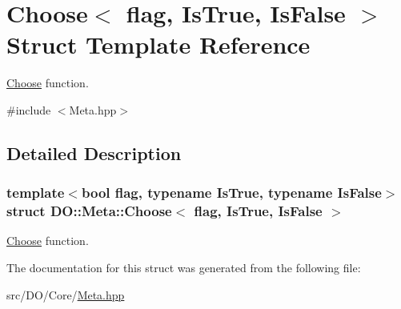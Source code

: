 \hypertarget{struct_d_o_1_1_meta_1_1_choose}{\section{Choose$<$ flag, Is\-True, Is\-False $>$ Struct Template Reference}
\label{struct_d_o_1_1_meta_1_1_choose}
}


\hyperlink{struct_d_o_1_1_meta_1_1_choose}{Choose} function.  




{\ttfamily \#include $<$Meta.\-hpp$>$}



\subsection{Detailed Description}
\subsubsection*{template$<$bool flag, typename Is\-True, typename Is\-False$>$struct D\-O\-::\-Meta\-::\-Choose$<$ flag, Is\-True, Is\-False $>$}

\hyperlink{struct_d_o_1_1_meta_1_1_choose}{Choose} function. 

The documentation for this struct was generated from the following file\-:\begin{DoxyCompactItemize}
\item 
src/\-D\-O/\-Core/\hyperlink{_meta_8hpp}{Meta.\-hpp}\end{DoxyCompactItemize}
